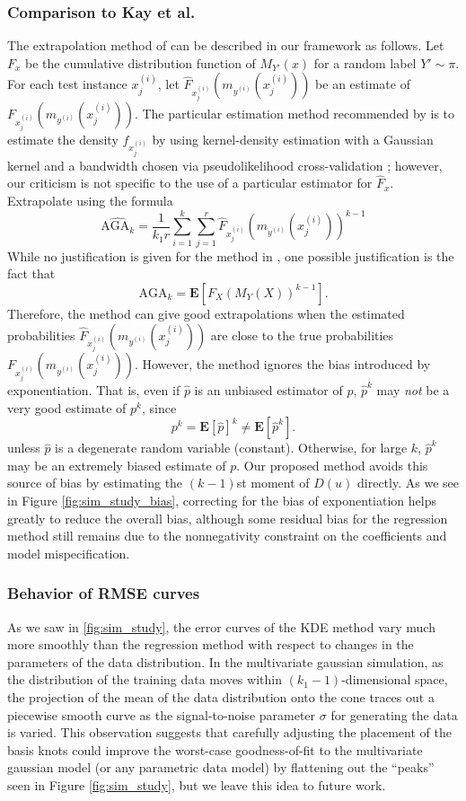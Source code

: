 \documentclass[twoside,11pt]{article}
\newcommand{\E}{\textbf{E}}
\begin{document}
\subsubsection*{Comparison to Kay et al.}
The extrapolation method of \cite{Kay2008a} can be described in our
framework as follows.  Let $F_x$ be the cumulative distribution
function of $M_{Y'}(x)$ for a random label $Y' \sim \pi$.  For each
test instance $x^{(i)}_j$, let
$\hat{F}_{x^{(i)}_j}(m_{y^{(i)}}(x^{(i)}_j))$ be an estimate of
$F_{x^{(i)}_j}(m_{y^{(i)}}(x^{(i)}_j))$.  The particular estimation
method recommended by \cite{Kay2008a} is to estimate the density
$f_{x^{(i)}_j}$ by using kernel-density estimation with a Gaussian
kernel and a bandwidth chosen via pseudolikelihood cross-validation
\citep{cao1994comparative}; however, our criticism is not specific to
the use of a particular estimator for $\hat{F}_x$.  Extrapolate using
the formula
\[
\widehat{\text{AGA}_k} = \frac{1}{k_1 r} \sum_{i=1}^k \sum_{j=1}^r \hat{F}_{x^{(i)}_j}(m_{y^{(i)}}(x^{(i)}_j))^{k-1}
\]
While no justification is given for the method in \cite{Kay2008a},  one possible justification is the fact that
\[\text{AGA}_k = \E[F_X(M_{Y}(X))^{k-1}].\]
Therefore, the method can give good extrapolations when the estimated
probabilities $\hat{F}_{x^{(i)}_j}(m_{y^{(i)}}(x^{(i)}_j))$ are close
to the true probabilities $F_{x^{(i)}_j}(m_{y^{(i)}}(x^{(i)}_j))$.
However, the method ignores the bias introduced by exponentiation.
That is, even if $\hat{p}$ is an unbiased estimator of $p$, $\hat{p}^k$ may \emph{not} be a very good estimate of $p^k$, since
\[
p^k = \E[\hat{p}]^k \neq \E[\hat{p}^k].
\]
unless $\hat{p}$ is a degenerate random variable
(constant). Otherwise, for large $k$, $\hat{p}^k$ may be an extremely
biased estimate of $p$.  Our proposed method avoids this source of
bias by estimating the $(k-1)$st moment of $D(u)$ directly.  As we see
in Figure \ref{fig:sim_study_bias}, correcting for the bias of
exponentiation helps greatly to reduce the overall bias, although some
residual bias for the regression method still remains due to the
nonnegativity constraint on the coefficients and model
mispecification.

\subsubsection*{Behavior of RMSE curves}
As we saw in \ref{fig:sim_study}, the error curves of the KDE method
vary much more smoothly than the regression method with respect to
changes in the parameters of the data distribution.  In the
multivariate gaussian simulation, as the distribution of the training
data moves within $(k_1-1)$-dimensional space, the projection of the
mean of the data distribution onto the cone traces out a piecewise
smooth curve as the signal-to-noise parameter $\sigma$ for generating
the data is varied.  This observation suggests that carefully
adjusting the placement of the basis knots could improve the
worst-case goodness-of-fit to the multivariate gaussian model (or any
parametric data model) by flattening out the ``peaks'' seen in Figure
\ref{fig:sim_study}, but we leave this idea to future work.
\end{document}
